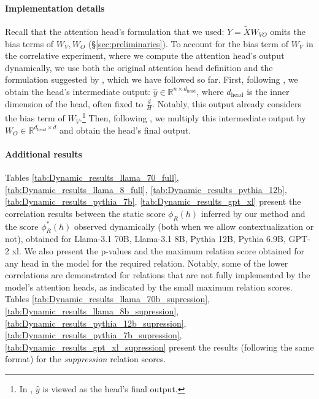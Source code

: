 \documentclass[11pt]{article}
\newcommand{\llamaThreeSeventyB}{Llama-3.1 70B}
\newcommand{\llamaThreeEightB}{Llama-3.1 8B}
\newcommand{\PythiaTwelveB}{Pythia 12B}
\newcommand{\PythiaSevenB}{Pythia 6.9B}
\newcommand{\GPTxl}{GPT-2 xl}
\begin{document}
\paragraph{Implementation details} 
Recall that the attention head's formulation that we used: $Y=\tilde{X}W_{VO}$ omits the bias terms of $W_V, W_O$ (\S\ref{sec:preliminaries}). 
To account for the bias term of $W_V$ in the correlative experiment, where we compute the attention head's output dynamically, we use both the original attention head definition \citet{Vaswani2017AttentionIA} and the formulation suggested by \citet{elhage2021mathematical}, which we have followed so far.
First, following \citet{Vaswani2017AttentionIA}, we obtain the head's intermediate output: 
$\hat{y}\in \mathbb{R}^{n \times d_\text{head}}$, where $d_\text{head}$ is the inner dimension of the head, often fixed to $\frac{d}{H}$. 
Notably, this output already considers the bias term of $W_V$.\footnote{In \citet{Vaswani2017AttentionIA}, $\hat{y}$ is viewed as the head's final output.}
Then, following \citet{elhage2021mathematical}, we multiply this intermediate output by 
$W_O \in \mathbb{R}^{{d_\text{head} \times d}}$ and obtain the head's final output. 

\paragraph{Additional results}
Tables \ref{tab:Dynamic_results_llama_70_full}, \ref{tab:Dynamic_results_llama_8_full}, \ref{tab:Dynamic_results_pythia_12b}, \ref{tab:Dynamic_results_pythia_7b}, \ref{tab:Dynamic_results_gpt_xl} present the correlation results between the static score $\phi_R(h)$ inferred by our method and the score $\phi^*_R(h)$ observed dynamically (both when we allow contextualization or not), obtained for \llamaThreeSeventyB{}, \llamaThreeEightB{}, \PythiaTwelveB{}, \PythiaSevenB{}, \GPTxl{}. We also present the p-values and the maximum relation score obtained for any head in the model for the required relation. Notably, some of the lower correlations are demonstrated for relations that are not fully implemented by the model's attention heads, as indicated by the small maximum relation scores.
Tables \ref{tab:Dynamic_results_llama_70b_supression}, \ref{tab:Dynamic_results_llama_8b_supression}, \ref{tab:Dynamic_results_pythia_12b_supression}, \ref{tab:Dynamic_results_pythia_7b_supression}, \ref{tab:Dynamic_results_gpt_xl_supression} present the results (following the same format) for the \emph{suppression} relation scores.
\end{document}
